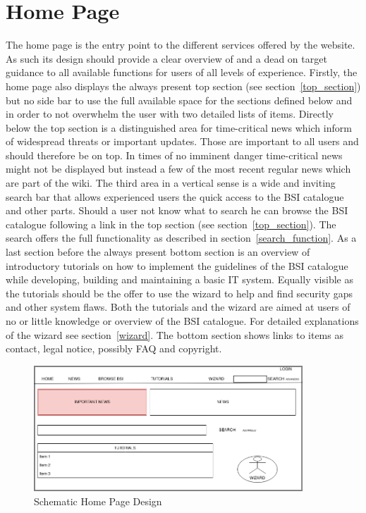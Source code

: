 \section{Home Page}
The home page is the entry point to the different services offered by the website. 
As such its design should provide a clear overview of and a dead on target guidance to all available functions for users of all levels of experience.
Firstly, the home page also displays the always present top section (see section~\ref{top_section}) but no side bar to use the full available space for the sections defined below and in order to not overwhelm the user with two detailed lists of items.
Directly below the top section is a distinguished area for time-critical news which inform of widespread threats or important updates.
Those are important to all users and should therefore be on top.
In times of no imminent danger time-critical news might not be displayed but instead a few of the most recent regular news which are part of the wiki.
The third area in a vertical sense is a wide and inviting search bar that allows experienced users the quick access to the BSI catalogue and other parts. 
Should a user not know what to search he can browse the BSI catalogue following a link in the top section (see section~\ref{top_section}).
The search offers the full functionality as described in section~\ref{search_function}.
As a last section before the always present bottom section is an overview of introductory tutorials on how to implement the guidelines of the BSI catalogue while developing, building and maintaining a basic IT system.
Equally visible as the tutorials should be the offer to use the wizard to help and find security gaps and other system flaws.
Both the tutorials and the wizard are aimed at users of no or little knowledge or overview of the BSI catalogue.
For detailed explanations of the wizard see section~\ref{wizard}.
The bottom section shows links to items as contact, legal notice, possibly FAQ and copyright.

\begin{figure}[h]
    \centering
    \includegraphics[width=0.9\textwidth]{Pictures/frontpage_mockup}
    \caption{Schematic Home Page Design}
\end{figure}
 
